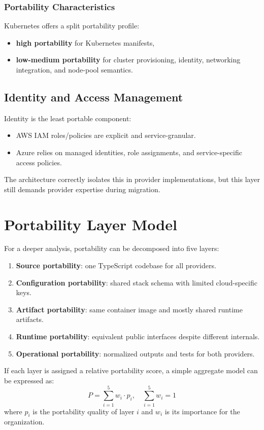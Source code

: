 \documentclass[conference]{IEEEtran}
\begin{document}
\subsubsection{Portability Characteristics}
Kubernetes offers a split portability profile:
\begin{itemize}
    \item \textbf{high portability} for Kubernetes manifests,
    \item \textbf{low-medium portability} for cluster provisioning, identity, networking integration, and node-pool semantics.
\end{itemize}

\subsection{Identity and Access Management}
Identity is the least portable component:
\begin{itemize}
    \item AWS IAM roles/policies are explicit and service-granular.
    \item Azure relies on managed identities, role assignments, and service-specific access policies.
\end{itemize}

The architecture correctly isolates this in provider implementations, but this layer still demands provider expertise during migration.

\section{Portability Layer Model}
For a deeper analysis, portability can be decomposed into five layers:
\begin{enumerate}
    \item \textbf{Source portability}: one TypeScript codebase for all providers.
    \item \textbf{Configuration portability}: shared stack schema with limited cloud-specific keys.
    \item \textbf{Artifact portability}: same container image and mostly shared runtime artifacts.
    \item \textbf{Runtime portability}: equivalent public interfaces despite different internals.
    \item \textbf{Operational portability}: normalized outputs and tests for both providers.
\end{enumerate}

If each layer is assigned a relative portability score, a simple aggregate model can be expressed as:
\[
P = \sum_{i=1}^{5} w_i \cdot p_i, \quad \sum_{i=1}^{5} w_i = 1
\]
where $p_i$ is the portability quality of layer $i$ and $w_i$ is its importance for the organization.
\end{document}
